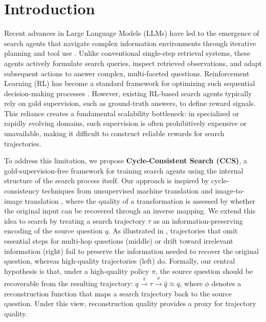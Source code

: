 \section{Introduction}

Recent advances in Large Language Models (LLMs) \citep{brown2020language, chung2024scaling} have led to the emergence of search agents \citep{search-o1, search-r1, r1-searcher, deepresearcher, ReSearch} that navigate complex information environments through iterative planning and tool use \citep{react}. Unlike conventional single-step retrieval systems, these agents actively formulate search queries, inspect retrieved observations, and adapt subsequent actions to answer complex, multi-faceted questions.
Reinforcement Learning (RL) has become a standard framework for optimizing such sequential decision-making processes \citep{ppo, grpo}. However, existing RL-based search agents typically rely on gold supervision, such as ground-truth answers, to define reward signals. This reliance creates a fundamental scalability bottleneck: in specialized or rapidly evolving domains, such supervision is often prohibitively expensive or unavailable, making it difficult to construct reliable rewards for search trajectories.

To address this limitation, we propose \textbf{Cycle-Consistent Search (CCS)}, a gold-supervision-free framework for training search agents using the internal structure of the search process itself. Our approach is inspired by cycle-consistency techniques from unsupervised machine translation \citep{he2016dual, lample2017unsupervised, han2021unsupervised} and image-to-image translation \citep{cyclegan, liu2017unsupervised, huang2018multimodal}, where the quality of a transformation is assessed by whether the original input can be recovered through an inverse mapping.
We extend this idea to search by treating a search trajectory $\tau$ as an information-preserving encoding of the source question $q$. As illustrated in , trajectories that omit essential steps for multi-hop questions (middle) or drift toward irrelevant information (right) fail to preserve the information needed to recover the original question, whereas high-quality trajectories (left) do. Formally, our central hypothesis is that, under a high-quality policy $\pi$, the source question should be recoverable from the resulting trajectory: $q \xrightarrow{\pi} \tau \xrightarrow{\phi} \hat{q} \approx q$, where $\phi$ denotes a reconstruction function that maps a search trajectory back to the source question. Under this view, reconstruction quality provides a proxy for trajectory quality.

